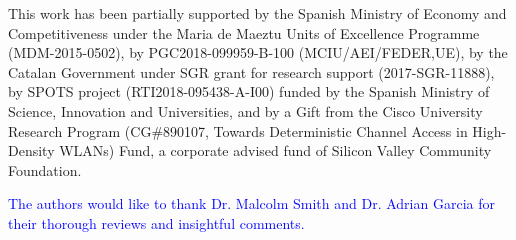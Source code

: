 \documentclass[comsoc]{IEEEtran}
\begin{document}
	This  work  has  been  partially  supported  by  the  Spanish Ministry of Economy and Competitiveness under the Maria de Maeztu  Units  of  Excellence  Programme  (MDM-2015-0502), by PGC2018-099959-B-100 (MCIU/AEI/FEDER,UE), by the Catalan Government under SGR grant for research support (2017-SGR-11888), by SPOTS project (RTI2018-095438-A-I00) funded by the Spanish Ministry of Science, Innovation and Universities, and  by a Gift from the Cisco University Research Program (CG\#890107, Towards Deterministic Channel Access in High-Density WLANs) Fund, a corporate advised fund of Silicon Valley Community Foundation.
	
	\textcolor{blue}{The authors would like to thank Dr. Malcolm Smith and Dr. Adrian Garcia for their thorough reviews and insightful comments.}
	
	\ifCLASSOPTIONcaptionsoff
	\newpage
	\fi
	
	
	
	
	
	
	
\end{document}
